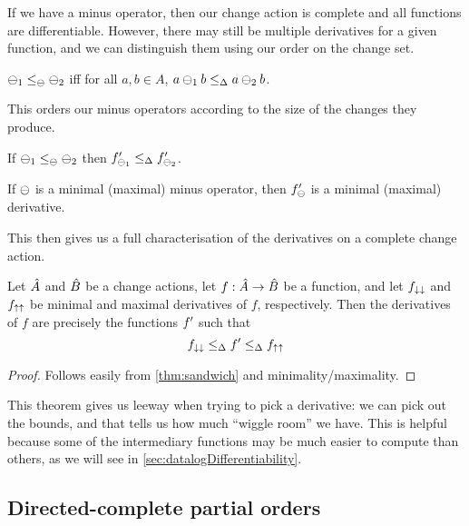 If we have a minus operator, then our change action is complete and all
functions are differentiable. However, there may still be multiple derivatives
for a given function, and we can distinguish them using our order on the change
set.

\begin{defn}
  $\ominus_1 \leq_\ominus \ominus_2$ iff for all $a,b \in A$, $a \ominus_1 b
  \leq_\Delta a \ominus_2 b$.
\end{defn}

This orders our minus operators according to the size of the changes they
produce. 

\begin{prop}
  If $\ominus_1 \leq_\ominus \ominus_2$ then
  $f'_{\ominus_1} \leq_\Delta f'_{\ominus_2}$.
\end{prop}

\begin{prop}
  If $\ominus$ is a minimal (maximal) minus operator, then $f'_\ominus$
  is a minimal (maximal) derivative.
\end{prop}

This then gives us a full characterisation of the derivatives on a complete
change action.

\begin{thm}
\label{thm:derivativeCharacterization}
  Let $\hat{A}$ and $\hat{B}$ be a change actions, let
  $f: \hat{A} \rightarrow \hat{B}$ be a function, and let $f_{\downarrow\downarrow}$ and
  $f_{\uparrow\uparrow}$ be minimal and maximal derivatives of $f$, respectively.
  Then the derivatives of $f$ are precisely
  the functions $f'$ such that
  $$f_{\downarrow\downarrow} \leq_\Delta f' \leq_\Delta f_{\uparrow\uparrow}$$
\end{thm}
\ifproofs
\begin{proof}
  Follows easily from \cref{thm:sandwich} and minimality/maximality.
\end{proof}
\fi

This theorem gives us leeway when trying to pick a derivative: we can pick out the
bounds, and that tells us how much ``wiggle room'' we have. This is helpful
because some of the intermediary functions may be much easier to compute than
others, as we will see in \cref{sec:datalogDifferentiability}.

\subsection{Directed-complete partial orders}

